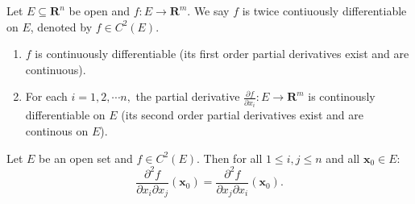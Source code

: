 \documentclass[12pt]{article}
\begin{document}
\begin{definition}
    Let $E\subseteq\mathbf{R}^n$ be open and $f:E\to\mathbf{R}^m.$
    We say $f$ is twice contiuously differentiable on $E$, denoted by $f\in C^2(E)$.
    \begin{enumerate}
    \item $f$ is continuously differentiable (its first order partial derivatives exist and are continuous).
    \item For each $i=1,2,\cdots n,$ the partial derivative $\frac{\partial f}{\partial x_i}: E\to\mathbf{R}^m$ is continously differentiable on $E$ (its second order partial derivatives exist and are continous on $E$).
\end{enumerate}
\end{definition}


\begin{theorem}[Clairaut]
Let $E$ be an open set and $f \in C^2(E)$. Then for all $1 \le i, j \le n$ and all $\mathbf{x}_0 \in E$:
$$\frac{\partial^2 f}{\partial x_i \partial x_j}(\mathbf{x}_0) = \frac{\partial^2 f}{\partial x_j \partial x_i}(\mathbf{x}_0).$$
\end{theorem}
\end{document}
